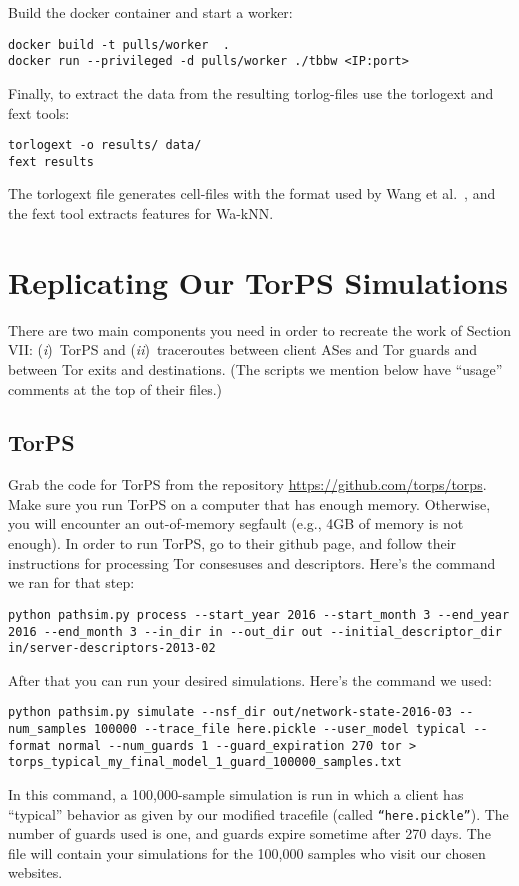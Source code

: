 \documentclass{article}
\newcommand{\first}{(\emph{i})\xspace}
\newcommand{\second}{(\emph{ii})\xspace}
\begin{document}
Build the docker container and start a worker:

\begin{lstlisting}
docker build -t pulls/worker  .
docker run --privileged -d pulls/worker ./tbbw <IP:port>
\end{lstlisting}

Finally, to extract the data from the resulting torlog-files use the
torlogext and fext tools:

\begin{lstlisting}
torlogext -o results/ data/
fext results
\end{lstlisting}
The torlogext file generates cell-files with the format used by
Wang et al.~\cite{Wang2014a}, and the fext tool extracts features for Wa-kNN.


%
%
%
%
%
%
\section{Replicating Our TorPS Simulations}
There are two main components you need in order to recreate the work of Section VII: 
\first~TorPS and \second~traceroutes between client ASes and Tor guards and between Tor 
exits and destinations. (The scripts we mention below have ``usage'' comments at the 
top of their files.)

\subsection{TorPS}
Grab the code for TorPS from the repository \url{https://github.com/torps/torps}.
Make sure you run TorPS on a computer 
that has enough memory. Otherwise, you will encounter an out-of-memory segfault (e.g., 4GB of 
memory is not enough). In order to run TorPS, go to their github page, and follow 
their instructions for processing Tor consesuses and descriptors. Here's the command 
we ran for that step:
\begin{lstlisting}
python pathsim.py process --start_year 2016 --start_month 3 --end_year 2016 --end_month 3 --in_dir in --out_dir out --initial_descriptor_dir in/server-descriptors-2013-02
\end{lstlisting}

After that you can run your desired simulations. Here's the command we used:
\begin{lstlisting}
python pathsim.py simulate --nsf_dir out/network-state-2016-03 --num_samples 100000 --trace_file here.pickle --user_model typical --format normal --num_guards 1 --guard_expiration 270 tor > torps_typical_my_final_model_1_guard_100000_samples.txt
\end{lstlisting}
In this command, a 100,000-sample simulation is run in which a client has ``typical'' 
behavior as given by our modified trace\textunderscore file (called {\tt ``here.pickle''}). 
The number of 
guards used is one, and guards expire sometime after 270 days. The file 
will contain your 
simulations for the 100,000 samples who visit our chosen websites. 
\end{document}
